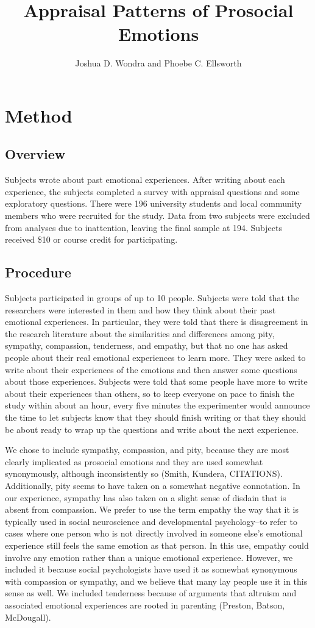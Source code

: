\documentclass[man]{apa6}
\title{Appraisal Patterns of Prosocial Emotions}
\author{Joshua D. Wondra and Phoebe C. Ellsworth}
\affiliation{University of Michigan}
\begin{document}

\maketitle

\section{Method}
\subsection{Overview}
Subjects wrote about past emotional experiences. After writing about each experience, the subjects completed a survey with appraisal questions and some exploratory questions. There were 196 university students and local community members who were recruited for the study. Data from two subjects were excluded from analyses due to inattention, leaving the final sample at 194. Subjects received \$10 or course credit for participating. 
\subsection{Procedure}
Subjects participated in groups of up to 10 people. Subjects were told that the researchers were interested in them and how they think about their past emotional experiences. In particular, they were told that there is disagreement in the research literature about the similarities and differences among pity, sympathy, compassion, tenderness, and empathy, but that no one has asked people about their real emotional experiences to learn more. They were asked to write about their experiences of the emotions and then answer some questions about those experiences. Subjects were told that some people have more to write about their experiences than others, so to keep everyone on pace to finish the study within about an hour, every five minutes the experimenter would announce the time to let subjects know that they should finish writing or that they should be about ready to wrap up the questions and write about the next experience.

We chose to include sympathy, compassion, and pity, because they are most clearly implicated as prosocial emotions and they are used somewhat synonymously, although inconsistently so (Smith, Kundera, CITATIONS). Additionally, pity seems to have taken on a somewhat negative connotation. In our experience, sympathy has also taken on a slight sense of disdain that is absent from compassion. We prefer to use the term empathy the way that it is typically used in social neuroscience and developmental psychology--to refer to cases where one person who is not directly involved in someone else's emotional experience still feels the same emotion as that person. In this use, empathy could involve any emotion rather than a unique emotional experience. However, we included it because social psychologists have used it as somewhat synonymous with compassion or sympathy, and we believe that many lay people use it in this sense as well. We included tenderness because of arguments that altruism and associated emotional experiences are rooted in parenting (Preston, Batson, McDougall).
\end{document}
